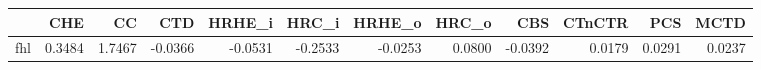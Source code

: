 \begin{tabular}{lrrrrrrrrrrr}
\toprule
 & CHE & CC & CTD & HRHE_i & HRC_i & HRHE_o & HRC_o & CBS & CTnCTR & PCS & MCTD \\
\midrule
fhl & 0.3484 & 1.7467 & -0.0366 & -0.0531 & -0.2533 & -0.0253 & 0.0800 & -0.0392 & 0.0179 & 0.0291 & 0.0237 \\
\bottomrule
\end{tabular}
